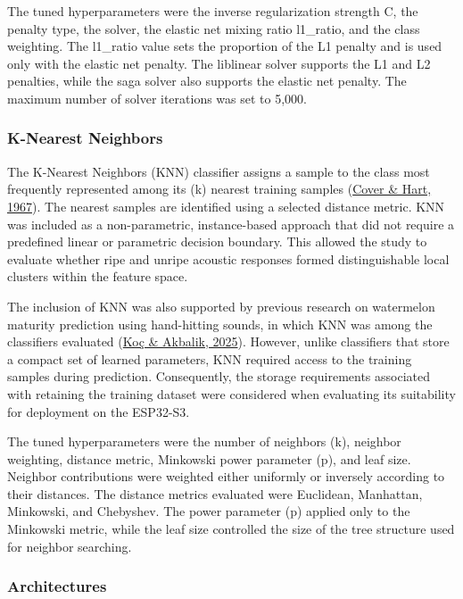 \begin{thesisprose}
The tuned hyperparameters were the inverse regularization strength C, the penalty type, the solver, the elastic net mixing ratio l1\_\allowbreak{}ratio, and the class weighting. The l1\_\allowbreak{}ratio value sets the proportion of the L1 penalty and is used only with the elastic net penalty. The liblinear solver supports the L1 and L2 penalties, while the saga solver also supports the elastic net penalty. The maximum number of solver iterations was set to 5,000.

\subsubsection*{K-Nearest Neighbors}

The K-Nearest Neighbors (KNN) classifier assigns a sample to the class most frequently represented among its (k) nearest training samples (\hyperlink{cite.cover1967}{Cover \& Hart, 1967}). The nearest samples are identified using a selected distance metric. KNN was included as a non-parametric, instance-based approach that did not require a predefined linear or parametric decision boundary. This allowed the study to evaluate whether ripe and unripe acoustic responses formed distinguishable local clusters within the feature space.

The inclusion of KNN was also supported by previous research on watermelon maturity prediction using hand-hitting sounds, in which KNN was among the classifiers evaluated (\hyperlink{cite.koc2025}{Koç \& Akbalik, 2025}). However, unlike classifiers that store a compact set of learned parameters, KNN required access to the training samples during prediction. Consequently, the storage requirements associated with retaining the training dataset were considered when evaluating its suitability for deployment on the ESP32-S3.

The tuned hyperparameters were the number of neighbors (k), neighbor weighting, distance metric, Minkowski power parameter (p), and leaf size. Neighbor contributions were weighted either uniformly or inversely according to their distances. The distance metrics evaluated were Euclidean, Manhattan, Minkowski, and Chebyshev. The power parameter (p) applied only to the Minkowski metric, while the leaf size controlled the size of the tree structure used for neighbor searching.

\subsubsection{Architectures}


\end{thesisprose}
